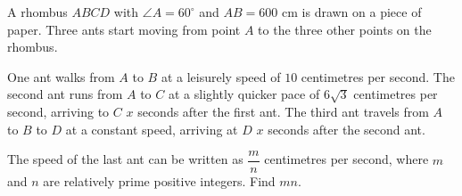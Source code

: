 A rhombus $ABCD$ with $\angle A = 60^\circ$ and $AB = 600$ cm is drawn on a piece of paper. Three ants start moving from point $A$ to the three other points on the rhombus.

One ant walks from $A$ to $B$ at a leisurely speed of $10$ centimetres per second. The second ant runs from $A$ to $C$ at a slightly quicker pace of $6\sqrt3$ centimetres per second, arriving to $C$ $x$ seconds after the first ant. The third ant travels from $A$ to $B$ to $D$ at a constant speed, arriving at $D$ $x$ seconds after the second ant.

The speed of the last ant can be written as $\dfrac{m}{n}$ centimetres per second, where $m$ and $n$ are relatively prime positive integers. Find $mn$.
